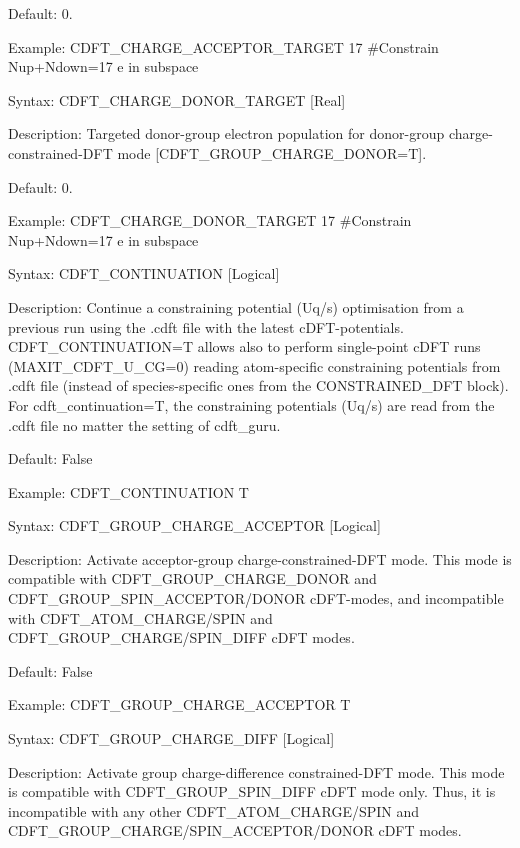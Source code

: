 \documentclass[letterpaper,10pt,english]{sphinxmanual}
\begin{document}
Default: 0.

Example: CDFT\_CHARGE\_ACCEPTOR\_TARGET 17 \#Constrain Nup+Ndown=17 e in
subspace


Syntax: CDFT\_CHARGE\_DONOR\_TARGET {[}Real{]}

Description: Targeted donor-group electron population for donor-group
charge-constrained-DFT mode {[}CDFT\_GROUP\_CHARGE\_DONOR=T{]}.

Default: 0.

Example: CDFT\_CHARGE\_DONOR\_TARGET 17 \#Constrain Nup+Ndown=17 e in
subspace


Syntax: CDFT\_CONTINUATION {[}Logical{]}

Description: Continue a constraining potential (Uq/s) optimisation from
a previous run using the .cdft file with the latest cDFT-potentials.
CDFT\_CONTINUATION=T allows also to perform single-point cDFT runs
(MAXIT\_CDFT\_U\_CG=0) reading atom-specific constraining potentials
from .cdft file (instead of species-specific ones from the
CONSTRAINED\_DFT block). For cdft\_continuation=T, the constraining
potentials (Uq/s) are read from the .cdft file no matter the setting of
cdft\_guru.

Default: False

Example: CDFT\_CONTINUATION T


Syntax: CDFT\_GROUP\_CHARGE\_ACCEPTOR {[}Logical{]}

Description: Activate acceptor-group charge-constrained-DFT mode. This
mode is compatible with CDFT\_GROUP\_CHARGE\_DONOR and
CDFT\_GROUP\_SPIN\_ACCEPTOR/DONOR cDFT-modes, and incompatible with
CDFT\_ATOM\_CHARGE/SPIN and CDFT\_GROUP\_CHARGE/SPIN\_DIFF cDFT modes.

Default: False

Example: CDFT\_GROUP\_CHARGE\_ACCEPTOR T


Syntax: CDFT\_GROUP\_CHARGE\_DIFF {[}Logical{]}

Description: Activate group charge-difference constrained-DFT mode. This
mode is compatible with CDFT\_GROUP\_SPIN\_DIFF cDFT mode only. Thus, it
is incompatible with any other CDFT\_ATOM\_CHARGE/SPIN and
CDFT\_GROUP\_CHARGE/SPIN\_ACCEPTOR/DONOR cDFT modes.
\end{document}
